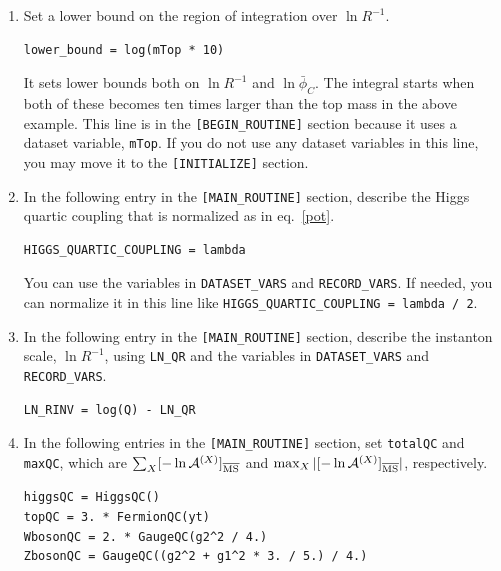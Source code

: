 \documentclass[12pt]{article}
\begin{document}
\begin{enumerate}
\item Set a lower bound on the region of integration over $\ln R^{-1}$.
\begin{lstlisting}[basicstyle=\ttfamily\footnotesize, frame=single]
lower_bound = log(mTop * 10)
\end{lstlisting}
       It sets lower bounds both on $\ln R^{-1}$ and $\ln\bar\phi_C$. The
       integral starts when both of these becomes ten times larger than
       the top mass in the above example. This line is in the
       \verb|[BEGIN_ROUTINE]| section because it uses a dataset variable,
       \verb|mTop|. If you do not use any dataset variables in this line,
       you may move it to the \verb|[INITIALIZE]| section.
 \item In the following entry in the \verb|[MAIN_ROUTINE]| section,
       describe the Higgs quartic coupling that is normalized as in
       eq.~\eqref{pot}.
\begin{lstlisting}[basicstyle=\ttfamily\footnotesize, frame=single]
HIGGS_QUARTIC_COUPLING = lambda
\end{lstlisting}
       You can use the variables in
       \verb|DATASET_VARS| and \verb|RECORD_VARS|.  If needed, you can
       normalize it in this line like
       \verb|HIGGS_QUARTIC_COUPLING = lambda / 2|.
 \item In the following entry in the \verb|[MAIN_ROUTINE]| section,
       describe the instanton scale, $\ln R^{-1}$, using \verb|LN_QR|
       and the variables in \verb|DATASET_VARS| and \verb|RECORD_VARS|.
\begin{lstlisting}[basicstyle=\ttfamily\footnotesize, frame=single]
LN_RINV = log(Q) - LN_QR
\end{lstlisting}
 \item In the following entries in the \verb|[MAIN_ROUTINE]| section,
       set \verb|totalQC| and \verb|maxQC|, which
       are $\sum_X[-\ln\mathcal A^{(X)}]_{\rm \overline{MS}}$ and
       $\max_X|[-\ln\mathcal A^{(X)}]_{\rm \overline{MS}}|$, respectively.
\begin{lstlisting}[basicstyle=\ttfamily\footnotesize, frame=single]
higgsQC = HiggsQC()
topQC = 3. * FermionQC(yt)
WbosonQC = 2. * GaugeQC(g2^2 / 4.)
ZbosonQC = GaugeQC((g2^2 + g1^2 * 3. / 5.) / 4.)


\end{lstlisting}
\end{enumerate}
\end{document}
